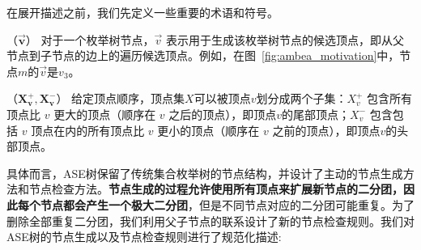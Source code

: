 在展开描述之前，我们先定义一些重要的术语和符号。

\begin{definition}
  （$\vec{\mathbf{v}}$） 对于一个枚举树节点，$\vec{v}$ 表示用于生成该枚举树节点的候选顶点，即从父节点到子节点的边上的遍历候选顶点。例如，在图~\ref{fig:ambea_motivation}中，节点$m$的$\vec{v}$是$v_3$。
\end{definition}

\begin{definition}
  （$\mathbf{X_v^+, X_v^-}$） 给定顶点顺序，顶点集$X$可以被顶点$v$划分成两个子集：$X_v^+$ 包含所有顶点比 $v$ 更大的顶点（顺序在 $v$ 之后的顶点），即顶点$v$的尾部顶点；$X_v^-$ 包含包括 $v$ 顶点在内的所有顶点比 $v$ 更小的顶点（顺序在 $v$ 之前的顶点），即顶点$v$的头部顶点。
\end{definition}


具体而言，ASE树保留了传统集合枚举树的节点结构，并设计了主动的节点生成方法和节点检查方法。\textbf{节点生成的过程允许使用所有顶点来扩展新节点的二分团，因此每个节点都会产生一个极大二分团}，但是不同节点对应的二分团可能重复。为了删除全部重复二分团，我们利用父子节点的联系设计了新的节点检查规则。我们对ASE树的节点生成以及节点检查规则进行了规范化描述:


  
  
